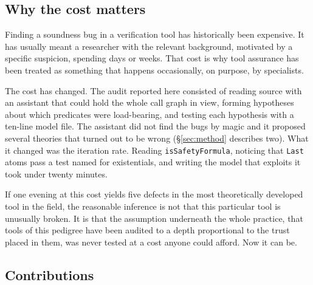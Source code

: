\documentclass[version=preprint]{iacrcc}
\newcommand{\code}[1]{\texttt{\small #1}}
\theoremstyle{definition}
\theoremstyle{remark}
\begin{document}
\subsection{Why the cost matters}

Finding a soundness bug in a verification tool has historically been expensive.
It has usually meant a researcher with the relevant background, motivated by a
specific suspicion, spending days or weeks. That cost is why tool assurance has
been treated as something that happens occasionally, on purpose, by specialists.

The cost has changed. The audit reported here consisted of reading source with
an assistant that could hold the whole call graph in view, forming hypotheses
about which predicates were load-bearing, and testing each hypothesis with a
ten-line model file. The assistant did not find the bugs by magic and it
proposed several theories that turned out to be wrong (\S\ref{sec:method}
describes two). What it changed was the iteration rate. Reading
\code{isSafetyFormula}, noticing that \code{Last} atoms pass a test named for
existentials, and writing the model that exploits it took under twenty minutes.

If one evening at this cost yields five defects in the most theoretically
developed tool in the field, the reasonable inference is not that this
particular tool is unusually broken. It is that the assumption underneath the
whole practice, that tools of this pedigree have been audited to a depth
proportional to the trust placed in them, was never tested at a cost anyone
could afford. Now it can be.

\subsection{Contributions}
\end{document}
